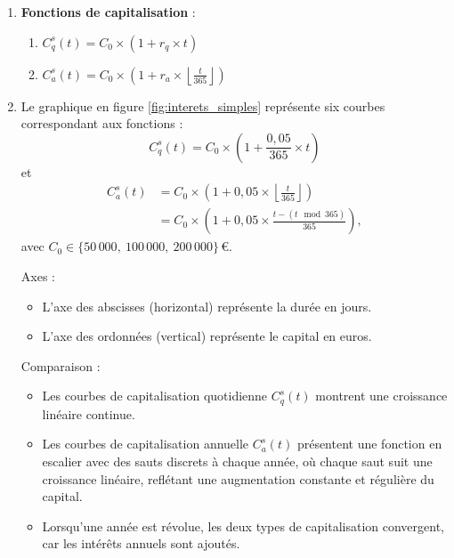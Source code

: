 \documentclass{article}
\begin{document}
\begin{enumerate}[label=\textbf{R1.\arabic*}]
	\item \textbf{Fonctions de capitalisation} :
	      \begin{enumerate}[label=(\alph*)]
	      	\item \( C_q^s(t) = C_0 \times \left(1 + r_q \times t\right) \)
	      	\item \( C_a^s(t) = C_0 \times \left(1 + r_a \times \left\lfloor\frac{t}{365}\right\rfloor\right) \)
	      \end{enumerate}
	      
	\item Le graphique en figure \ref{fig:interets_simples} représente six courbes correspondant aux fonctions :
	      \[
	      	C_q^s(t) = C_0 \times \left(1 + \frac{0{,}05}{365} \times t\right)
	      \]
	      et
	      \[
	      	\begin{aligned}
	      		C_a^s(t) & = C_0 \times \left(1 + 0{,}05 \times \left\lfloor\frac{t}{365}\right\rfloor\right) \\
	      		         & = C_0 \times \left(1 + 0{,}05 \times \frac{t - (t \!\!\!\mod 365)}{365}\right),    
	      	\end{aligned}
	      \]
	      avec \( C_0 \in \bigl\{50\,000,\ 100\,000,\ 200\,000\bigr\}\,\text{€} \).
	      
	      Axes :
	      \begin{itemize}
	      	\item L'axe des abscisses (horizontal) représente la durée en jours.
	      	\item L'axe des ordonnées (vertical) représente le capital en euros.
	      \end{itemize}
	      
	      Comparaison :
	      \begin{itemize}
	      	\item Les courbes de capitalisation quotidienne $C_q^s(t)$ montrent une croissance linéaire continue.
	      	\item Les courbes de capitalisation annuelle $C_a^s(t)$ présentent une fonction en escalier avec des sauts discrets à chaque année, où chaque saut suit une croissance linéaire, reflétant une augmentation constante et régulière du capital.
	      	\item Lorsqu'une année est révolue, les deux types de capitalisation convergent, car les intérêts annuels sont ajoutés.
	      \end{itemize}
	      

\end{enumerate}
\end{document}
